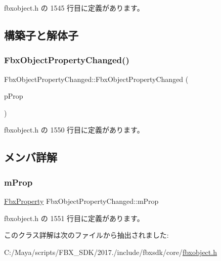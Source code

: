  fbxobject.\+h の 1545 行目に定義があります。



\subsection{構築子と解体子}
\mbox{\label{class_fbx_object_property_changed_a48bdf8b5f7fb7f5e0b2a87cc00f9876b}} 
\subsubsection{\texorpdfstring{Fbx\+Object\+Property\+Changed()}{FbxObjectPropertyChanged()}}
{\footnotesize\ttfamily Fbx\+Object\+Property\+Changed\+::\+Fbx\+Object\+Property\+Changed (\begin{DoxyParamCaption}\item[{\hyperlink{class_fbx_property}{Fbx\+Property}}]{p\+Prop }\end{DoxyParamCaption})\hspace{0.3cm}{\ttfamily [inline]}}



 fbxobject.\+h の 1550 行目に定義があります。



\subsection{メンバ詳解}
\mbox{\label{class_fbx_object_property_changed_a941055bc705ac87af79a63c46fb7a5a0}} 
\subsubsection{\texorpdfstring{m\+Prop}{mProp}}
{\footnotesize\ttfamily \hyperlink{class_fbx_property}{Fbx\+Property} Fbx\+Object\+Property\+Changed\+::m\+Prop}



 fbxobject.\+h の 1551 行目に定義があります。



このクラス詳解は次のファイルから抽出されました\+:\begin{DoxyCompactItemize}
\item 
C\+:/\+Maya/scripts/\+F\+B\+X\+\_\+\+S\+D\+K/2017./include/fbxsdk/core/\hyperlink{fbxobject_8h}{fbxobject.\+h}\end{DoxyCompactItemize}
